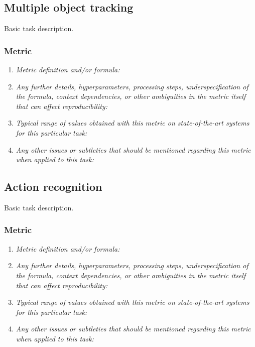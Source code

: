 \documentclass[a4paper,11pt]{article}
\begin{document}
    \subsection{Multiple object tracking}
        Basic task description.
        \subsubsection{Metric}
            \begin{enumerate}[label=\alph*.]
                \item \textit{Metric definition and/or formula:}
                \bigskip
                \item \textit{Any further details, hyperparameters, processing steps, underspecification of the formula, context dependencies, or other ambiguities in the metric itself that can affect reproducibility:}
                \bigskip
                \item \textit{Typical range of values obtained with this metric on state-of-the-art systems for this particular task:}
                \bigskip
                \item \textit{Any other issues or subtleties that should be mentioned regarding this metric when applied to this task:}
                \bigskip
            \end{enumerate}

    \subsection{Action recognition}
        Basic task description.
        \subsubsection{Metric}
            \begin{enumerate}[label=\alph*.]
                \item \textit{Metric definition and/or formula:}
                \bigskip
                \item \textit{Any further details, hyperparameters, processing steps, underspecification of the formula, context dependencies, or other ambiguities in the metric itself that can affect reproducibility:}
                \bigskip
                \item \textit{Typical range of values obtained with this metric on state-of-the-art systems for this particular task:}
                \bigskip
                \item \textit{Any other issues or subtleties that should be mentioned regarding this metric when applied to this task:}
                \bigskip
            \end{enumerate}
\end{document}
